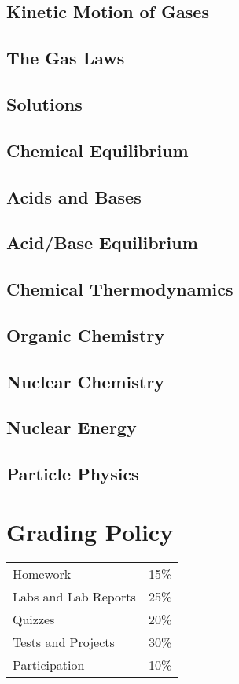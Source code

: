 \documentclass[12pt]{article}
\begin{document}
\subsection{Kinetic Motion of Gases}

\subsection{The Gas Laws}

\subsection{Solutions}

\subsection{Chemical Equilibrium}

\subsection{Acids and Bases}

\subsection{Acid/Base Equilibrium}

\subsection{Chemical Thermodynamics}

\subsection{Organic Chemistry}

\subsection{Nuclear Chemistry}

\subsection{Nuclear Energy}

\subsection{Particle Physics}


\section*{Grading Policy}
\begin{tabular}{ll}
Homework & 15\% \\
Labs and Lab Reports & 25\% \\
Quizzes & 20\% \\
Tests and Projects & 30\% \\
Participation & 10\% \\
\end{tabular}
\end{document}
